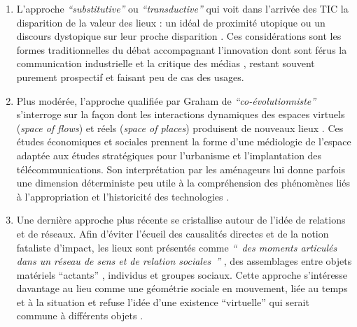\begin{enumerate}

\item L’approche \textit{``substitutive''} ou \textit{``transductive''} qui voit dans l’arrivée des TIC la disparition de la valeur des lieux : un idéal de proximité utopique \citep{McLuhan1962} ou un discours dystopique sur leur proche disparition \citep{Virilio1998, Auge1995}. Ces considérations sont les formes traditionnelles du débat accompagnant l’innovation dont sont férus la communication industrielle et la critique des médias \citep{Ramonet2001}, restant souvent purement prospectif et faisant peu de cas des usages.

\item Plus modérée, l’approche qualifiée par Graham de \textit{``co-évolutionniste''} s’interroge sur la façon dont les interactions dynamiques des espaces virtuels (\textit{space of flows}) et réels (\textit{space of places}) \citep{Castells2009} produisent de nouveaux lieux . Ces études économiques et sociales prennent la forme d’une médiologie de l’espace adaptée aux études stratégiques pour l’urbanisme et l’implantation des télécommunications. Son interprétation par les aménageurs lui donne parfois une dimension déterministe peu utile à la compréhension des phénomènes liés à l’appropriation et l’historicité des technologies \citep{Offner1993}.

\item Une dernière approche plus récente se cristallise autour de l’idée de relations et de réseaux. Afin d’éviter l’écueil des causalités directes et de la notion fataliste d’impact, les lieux sont présentés comme \textit{`` des moments articulés dans un réseau de sens et de relation sociales ''} \citep{Massey1993}, des assemblages entre objets matériels “actants” \citep{Latour1996}, individus et groupes sociaux. Cette approche s’intéresse davantage au lieu comme une géométrie sociale en mouvement, liée au temps et à la situation \citep{May2001} et refuse l’idée d’une existence “virtuelle” qui serait commune à différents objets \citep{Bingham1996}.

\end{enumerate}


